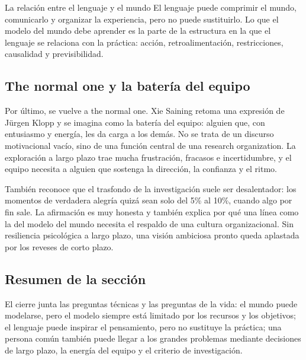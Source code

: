 \begin{importantbox}{La relación entre el lenguaje y el mundo}
El lenguaje puede comprimir el mundo, comunicarlo y organizar la experiencia, pero no puede sustituirlo. Lo que el modelo del mundo debe aprender es la parte de la estructura en la que el lenguaje se relaciona con la práctica: acción, retroalimentación, restricciones, causalidad y previsibilidad.
\end{importantbox}

\subsection{The normal one y la batería del equipo}

Por último, se vuelve a the normal one. Xie Saining retoma una expresión de Jürgen Klopp y se imagina como la batería del equipo: alguien que, con entusiasmo y energía, les da carga a los demás. No se trata de un discurso motivacional vacío, sino de una función central de una research organization. La exploración a largo plazo trae mucha frustración, fracasos e incertidumbre, y el equipo necesita a alguien que sostenga la dirección, la confianza y el ritmo.

También reconoce que el trasfondo de la investigación suele ser desalentador: los momentos de verdadera alegría quizá sean solo del 5\% al 10\%, cuando algo por fin sale. La afirmación es muy honesta y también explica por qué una línea como la del modelo del mundo necesita el respaldo de una cultura organizacional. Sin resiliencia psicológica a largo plazo, una visión ambiciosa pronto queda aplastada por los reveses de corto plazo.

\subsection{Resumen de la sección}

El cierre junta las preguntas técnicas y las preguntas de la vida: el mundo puede modelarse, pero el modelo siempre está limitado por los recursos y los objetivos; el lenguaje puede inspirar el pensamiento, pero no sustituye la práctica; una persona común también puede llegar a los grandes problemas mediante decisiones de largo plazo, la energía del equipo y el criterio de investigación.
